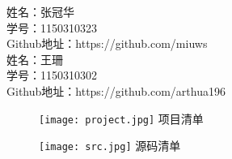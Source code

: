 \renewcommand{\textfraction}{0.05} 




\noindent 姓名：张冠华~\\
学号：1150310323~\\
Github地址：https://github.com/miuws~\\

\noindent 姓名：王珊~\\
学号：1150310302~\\
Github地址：https://github.com/arthua196
\begin{figure}[h]
\begin{center}
  \texttt{[image: project.jpg]}
  项目清单
\end{center}
\end{figure}

\begin{figure}[h]
\begin{center}
  \texttt{[image: src.jpg]}
  源码清单
\end{center}
\end{figure}


